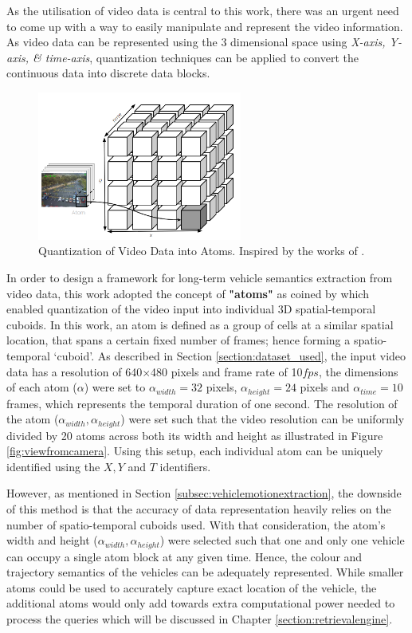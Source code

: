 As the utilisation of video data is central to this work, there was an urgent need to come up with a way to easily manipulate and represent the video information. As video data can be represented using the 3 dimensional space using \textit{X-axis, Y-axis, \& time-axis}, quantization techniques can be applied to convert the continuous data into discrete data blocks.


\begin{figure}[H]\centering
\includegraphics[width=0.6\textwidth]{image/general/atom.PNG}
\caption[Quantization of Video Data into Atoms.]
{Quantization of Video Data into Atoms.
Inspired by the works of .}
\label{fig:atoms}
\end{figure}


In order to design a framework for long-term vehicle semantics extraction from video data, this work adopted the concept of \textbf{"atoms"} as coined by \cite{castanon2016retrieval} which enabled quantization of the video input into individual 3D spatial-temporal cuboids. In this work, an atom is defined as a group of cells at a similar spatial location, that spans a certain fixed number of frames; hence forming a spatio-temporal `cuboid'.
As described in Section \ref{section:dataset_used}, the input video data has a resolution of 640$\times$480 pixels and frame rate of 10$fps$, the dimensions of each atom ($\alpha$) were set to $\alpha_{width}=32$ pixels, $\alpha_{height}=24$ pixels and $\alpha_{time}=10$ frames, which represents the temporal duration of one second. The resolution of the atom ($\alpha_{width},\alpha_{height}$) were set such that the video resolution can be uniformly divided by 20 atoms across both its width and height as illustrated in Figure \ref{fig:viewfromcamera}. Using this setup, each individual atom can be uniquely identified using the $X, Y$ and $T$ identifiers.


However, as mentioned in Section \ref{subsec:vehiclemotionextraction}, the downside of this method is that the accuracy of data representation heavily relies on the number of spatio-temporal cuboids used. With that consideration, the atom's width and height ($\alpha_{width}, \alpha_{height}$) were selected such that one and only one vehicle can occupy a single atom block at any given time. Hence, the colour and trajectory semantics of the vehicles can be adequately represented. While smaller atoms could be used to accurately capture exact location of the vehicle, the additional atoms would only add towards extra computational power needed to process the queries which will be discussed in Chapter \ref{section:retrievalengine}.

